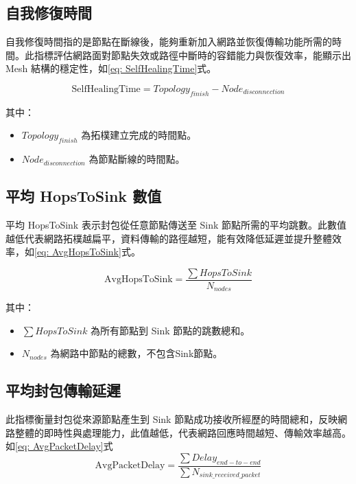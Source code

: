 \begin{ZhChapter}
\subsection{自我修復時間}
自我修復時間指的是節點在斷線後，能夠重新加入網路並恢復傳輸功能所需的時間。此指標評估網路面對節點失效或路徑中斷時的容錯能力與恢復效率，能顯示出 Mesh 結構的穩定性，如\ref{eq: SelfHealingTime}式。

\begin{equation}
\label{eq: SelfHealingTime}
\text{SelfHealingTime} = Topology_{finish} - Node_{disconnection}
\end{equation}

其中：
\begin{itemize}
    \item $Topology_{finish}$ 為拓樸建立完成的時間點。
    \item $Node_{disconnection}$ 為節點斷線的時間點。
\end{itemize}

\subsection{平均 HopsToSink 數值}
平均 HopsToSink 表示封包從任意節點傳送至 Sink 節點所需的平均跳數。此數值越低代表網路拓樸越扁平，資料傳輸的路徑越短，能有效降低延遲並提升整體效率，如\ref{eq: AvgHopsToSink}式。

\begin{equation}
\label{eq: AvgHopsToSink}
\text{AvgHopsToSink} = \frac{\sum HopsToSink}{N_{nodes}}
\end{equation}

其中：
\begin{itemize}
    \item $\sum HopsToSink$ 為所有節點到 Sink 節點的跳數總和。
    \item $N_{nodes}$ 為網路中節點的總數，不包含Sink節點。
\end{itemize}

\subsection{平均封包傳輸延遲}
此指標衡量封包從來源節點產生到 Sink 節點成功接收所經歷的時間總和，反映網路整體的即時性與處理能力，此值越低，代表網路回應時間越短、傳輸效率越高。如\ref{eq: AvgPacketDelay}式
\begin{equation}
\label{eq: AvgPacketDelay}
\text{AvgPacketDelay} = \frac{\sum Delay_{end-to-end}}{\sum N_{sink\_received\_packet}}
\end{equation}


\end{ZhChapter}
